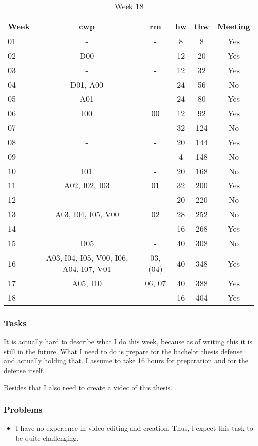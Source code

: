 \begin{table}[!ht]
    \begin{center}
        \caption{Week 18}
        \label{tab:journal:week18}
        \begin{tabular}{l|c|c|c|c|c}
            \textbf{Week} & \textbf{\gls{cwp}} & \textbf{\gls{rm}} & \textbf{\gls{hw}} & \textbf{\gls{thw}} & \textbf{Meeting}\\
        \hline
        01 & - & - & 8 & 8 & Yes \\
        02 & D00 & - & 12 & 20 & Yes \\
        03 & - & - & 12 & 32 & Yes \\
        04 & D01, A00 & - & 24 & 56 & No \\
        05 & A01 & - & 24 & 80 & Yes \\
        06 & I00 & 00 & 12 & 92 & Yes \\
        07 & - & - & 32 & 124 & No \\
        08 & - & - & 20 & 144 & Yes \\
        09 & - & - & 4 & 148 & No \\
        10 & I01 & - & 20 & 168 & No \\
        11 & A02, I02, I03 & 01 & 32 & 200 & Yes \\
        12 & - & - & 20 & 220 & No \\
        13 & A03, I04, I05, V00 & 02 & 28 & 252 & No \\
        14 & - & - & 16 & 268 & Yes \\
        15 & D05 & - & 40 & 308 & No \\
        16 & A03, I04, I05, V00, I06, A04, I07, V01 & 03, (04) & 40 & 348 & Yes \\
        17 & A05, I10 & 06, 07 & 40 & 388 & Yes \\
        18 & - & - & 16 & 404 & Yes \\
        \end{tabular}
    \end{center}
\end{table}

\subsubsection{Tasks}

It is actually hard to describe what I do this week, because as of writing this it is still in the future. What I need to do is prepare for the bachelor thesis defense and actually holding that. I assume to take 16 hours for preparation and for the defense itself. 

Besides that I also need to create a video of this thesis. 

\subsubsection{Problems}

\begin{itemize}
    \item I have no experience in video editing and creation. Thus, I expect this task to be quite challenging.
\end{itemize}